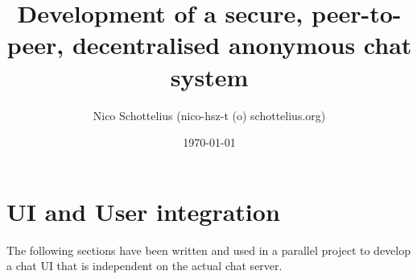 \documentclass[12pt,a4paper]{report}
\begin{document}
\title{Development of a secure, peer-to-peer, decentralised anonymous chat system}
\date{\today}
\author{Nico Schottelius (nico-hsz-t (o) schottelius.org)}
\maketitle
\newpage
\tableofcontents
\listoftables
\listoffigures
\newpage



















\appendix

\chapter{UI and User integration}
The following sections have been written and used in a parallel project to
develop a chat UI that is independent on the actual chat server.


\end{document}
